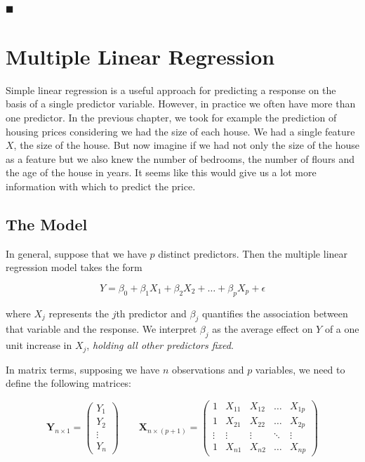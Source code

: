 \documentclass[]{book}
\begin{document}
◼

\chapter{Multiple Linear Regression}\label{multiple-linear-regression}

Simple linear regression is a useful approach for predicting a response
on the basis of a single predictor variable. However, in practice we
often have more than one predictor. In the previous chapter, we took for
example the prediction of housing prices considering we had the size of
each house. We had a single feature \(X\), the size of the house. But
now imagine if we had not only the size of the house as a feature but we
also knew the number of bedrooms, the number of flours and the age of
the house in years. It seems like this would give us a lot more
information with which to predict the price.

\section{The Model}\label{the-model}

In general, suppose that we have \(p\) distinct predictors. Then the
multiple linear regression model takes the form

\[ Y = \beta_0 + \beta_1 X_1 + \beta_2 X_2 + \dots + \beta_p X_p + \epsilon \]

where \(X_j\) represents the \(j\)th predictor and \(\beta_j\)
quantifies the association between that variable and the response. We
interpret \(\beta_j\) as the average effect on \(Y\) of a one unit
increase in \(X_j\), \emph{holding all other predictors fixed}.

In matrix terms, supposing we have \(n\) observations and \(p\)
variables, we need to define the following matrices:

\begin{equation}
 \textbf{Y}_{n \times 1} = \begin{pmatrix}
    Y_{1} \\
    Y_{2} \\
    \vdots \\
    Y_{n}
\end{pmatrix}   \,\,\,\,\,\,\,\,\,\,\,\,  \textbf{X}_{n \times (p+1)}  = \begin{pmatrix}
    1      & X_{11} & X_{12} & \dots  & X_{1p} \\
    1      & X_{21} & X_{22} & \dots  & X_{2p} \\
    \vdots & \vdots & \vdots & \ddots & \vdots \\
    1      & X_{n1} & X_{n2} & \dots  & X_{np}
\end{pmatrix}
\end{equation}
\end{document}
